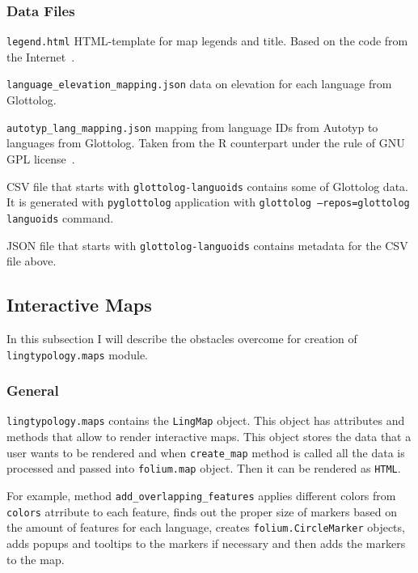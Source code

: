 \documentclass[a4paper,12pt]{article}
\begin{document}
\subsubsection{Data Files}
\begin{itemize}
\begin{samepage}
 \item \texttt{legend.html} HTML-template for map legends and title. Based on the code from the Internet~\parencite{legend}.
 \item \texttt{language\_elevation\_mapping.json} data on elevation for each language from Glottolog.
 \item \texttt{autotyp\_lang\_mapping.json} mapping from language IDs from Autotyp to languages from Glottolog. Taken from the R counterpart under the rule of GNU GPL license~\parencite{GeorgeMoroz2018}.
 \item CSV file that starts with \texttt{glottolog-languoids} contains some of Glottolog data. It is generated with \texttt{pyglottolog} application with \texttt{glottolog --repos=glottolog languoids} command.
 \item JSON file that starts with \texttt{glottolog-languoids} contains metadata for the CSV file above.
\end{samepage}
\end{itemize}


\subsection{Interactive Maps}
In this subsection I will describe the obstacles overcome for creation of \texttt{lingtypology.maps} module.

\subsubsection{General}
\texttt{lingtypology.maps} contains the \texttt{LingMap} object. This object has attributes and methods that allow to render interactive maps. This object stores the data that a user wants to be rendered and when \texttt{create\_map} method is called all the data is processed and passed into \texttt{folium.map} object. Then it can be rendered as \texttt{HTML}.

For example, method \texttt{add\_overlapping\_features} applies different colors from \texttt{colors} atrribute to each feature, finds out the proper size of markers based on the amount of features for each language, creates 
\texttt{folium.CircleMarker} objects, adds popups and tooltips to the markers if necessary and then adds the markers to the map.
\end{document}
